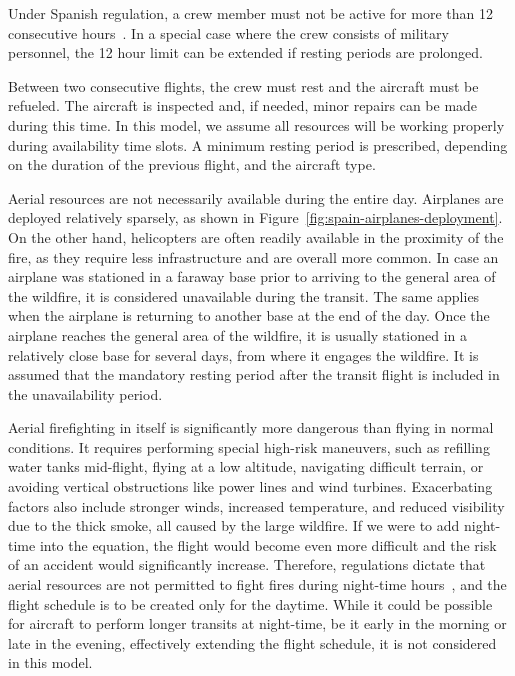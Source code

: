 Under Spanish regulation, a crew member must not be active for more than 12 consecutive hours~\cite{Spain/AnnexCircular}.
In a special case where the crew consists of military personnel, the 12 hour limit can be extended if resting periods are prolonged.

Between two consecutive flights, the crew must rest and the aircraft must be refueled.
The aircraft is inspected and, if needed, minor repairs can be made during this time.
In this model, we assume all resources will be working properly during availability time slots.
A minimum resting period is prescribed, depending on the duration of the previous flight, and the aircraft type.

Aerial resources are not necessarily available during the entire day.
Airplanes are deployed relatively sparsely, as shown in Figure~\ref{fig:spain-airplanes-deployment}.
On the other hand, helicopters are often readily available in the proximity of the fire, as they require less infrastructure and are overall more common.
In case an airplane was stationed in a faraway base prior to arriving to the general area of the wildfire, it is considered unavailable during the transit.
The same applies when the airplane is returning to another base at the end of the day.
Once the airplane reaches the general area of the wildfire, it is usually stationed in a relatively close base for several days, from where it engages the wildfire.
It is assumed that the mandatory resting period after the transit flight is included in the unavailability period.

Aerial firefighting in itself is significantly more dangerous than flying in normal conditions.
It requires performing special high-risk maneuvers, such as refilling water tanks mid-flight, flying at a low altitude, navigating difficult terrain, or avoiding vertical obstructions like power lines and wind turbines.
Exacerbating factors also include stronger winds, increased temperature, and reduced visibility due to the thick smoke, all caused by the large wildfire.
If we were to add night-time into the equation, the flight would become even more difficult and the risk of an accident would significantly increase.
Therefore, regulations dictate that aerial resources are not permitted to fight fires during night-time hours~\cite{Spain/AnnexCircular}, and the flight schedule is to be created only for the daytime.
While it could be possible for aircraft to perform longer transits at night-time, be it early in the morning or late in the evening, effectively extending the flight schedule, it is not considered in this model.


